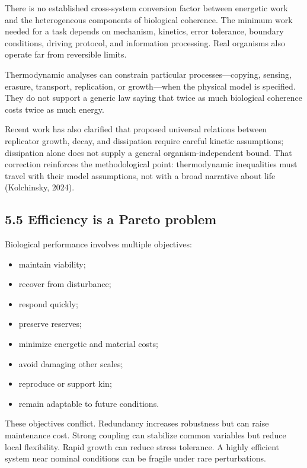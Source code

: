 \documentclass[
  11pt,
]{article}
\providecommand{\tightlist}{%
  \setlength{\itemsep}{0pt}\setlength{\parskip}{0pt}}
\begin{document}
There is no established cross-system conversion factor between energetic
work and the heterogeneous components of biological coherence. The
minimum work needed for a task depends on mechanism, kinetics, error
tolerance, boundary conditions, driving protocol, and information
processing. Real organisms also operate far from reversible limits.

Thermodynamic analyses can constrain particular processes---copying,
sensing, erasure, transport, replication, or growth---when the physical
model is specified. They do not support a generic law saying that twice
as much biological coherence costs twice as much energy.

Recent work has also clarified that proposed universal relations between
replicator growth, decay, and dissipation require careful kinetic
assumptions; dissipation alone does not supply a general
organism-independent bound. That correction reinforces the
methodological point: thermodynamic inequalities must travel with their
model assumptions, not with a broad narrative about life (Kolchinsky,
2024).

\subsection{5.5 Efficiency is a Pareto
problem}\label{efficiency-is-a-pareto-problem}

Biological performance involves multiple objectives:

\begin{itemize}
\tightlist
\item
  maintain viability;
\item
  recover from disturbance;
\item
  respond quickly;
\item
  preserve reserves;
\item
  minimize energetic and material costs;
\item
  avoid damaging other scales;
\item
  reproduce or support kin;
\item
  remain adaptable to future conditions.
\end{itemize}

These objectives conflict. Redundancy increases robustness but can raise
maintenance cost. Strong coupling can stabilize common variables but
reduce local flexibility. Rapid growth can reduce stress tolerance. A
highly efficient system near nominal conditions can be fragile under
rare perturbations.
\end{document}
